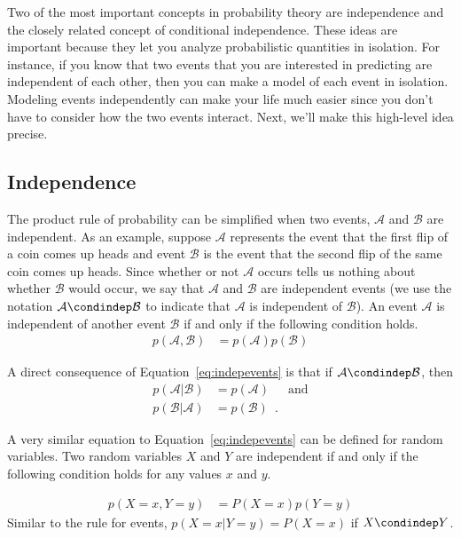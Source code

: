 \documentclass[assignment02_Solutions]{subfiles}
\begin{document}
Two of the most important concepts in probability theory are independence and the closely related concept of conditional independence.  These ideas are important because they let you analyze probabilistic quantities in isolation.  For instance, if you know that two events that you are interested in predicting are independent of each other, then you can make a model of each event in isolation.  Modeling events independently can make your life much easier since you don't have to consider how the two events interact.  Next, we'll make this high-level idea precise.

\subsection{Independence}
The product rule of probability can be simplified when two events, $\mathcal{A}$ and $\mathcal{B}$ are independent.  As an example, suppose $\mathcal{A}$ represents the event that the first flip of a coin comes up heads and event $\mathcal{B}$ is the event that the second flip of the same coin comes up heads.  Since whether or not $\mathcal{A}$ occurs tells us nothing about whether $\mathcal{B}$ would occur, we say that $\mathcal{A}$ and $\mathcal{B}$ are independent events (we use the notation $\mathcal{A} \condindep \mathcal{B}$ to indicate that $\mathcal{A}$ is independent of $\mathcal{B}$).  An event $\mathcal{A}$ is independent of another event $\mathcal{B}$ if and only if the following condition holds.
\begin{align}
p(\mathcal{A}, \mathcal{B}) &= p(\mathcal{A}) p(\mathcal{B}) \label{eq:indepevents}
\end{align}

A direct consequence of Equation~\ref{eq:indepevents} is that if $\mathcal{A} \condindep \mathcal{B}$, then
\begin{align}
p(\mathcal{A} | \mathcal{B}) &= p(\mathcal{A}) & \mbox{and} \nonumber \\
p(\mathcal{B} | \mathcal{A}) &= p(\mathcal{B}) \enspace . \nonumber
\end{align}

A very similar equation to Equation~\ref{eq:indepevents} can be defined for random variables.  Two random variables $X$ and $Y$ are independent if and only if the following condition holds for any values $x$ and $y$.

\begin{align}
p(X=x, Y=y) &= P(X=x) p(Y=y)
\end{align}
Similar to the rule for events, $p(X=x | Y=y) = P(X=x)$ if $X \condindep Y$.
\end{document}
